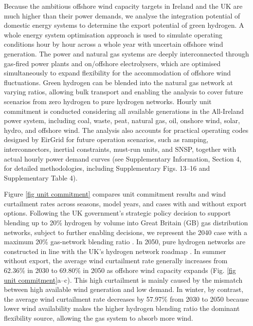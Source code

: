 \documentclass[pdflatex,sn-mathphys,Numbered]{sn-jnl}%
\begin{document}
Because the ambitious offshore wind capacity targets in Ireland and the UK are much higher than their power demands, we analyse the integration potential of domestic energy systems to determine the export potential of green hydrogen. A whole energy system optimisation approach is used to simulate operating conditions hour by hour across a whole year with uncertain offshore wind generation. The power and natural gas systems are deeply interconnected through gas-fired power plants and on/offshore electrolysers, which are optimised simultaneously to expand flexibility for the accommodation of offshore wind fluctuations. Green hydrogen can be blended into the natural gas network at varying ratios, allowing bulk transport and enabling the analysis to cover future scenarios from zero hydrogen to pure hydrogen networks.
Hourly unit commitment is conducted considering all available generations in the All-Ireland power system, including coal, waste, peat, natural gas, oil, onshore wind, solar, hydro, and offshore wind. The analysis also accounts for practical operating codes designed by EirGrid \cite{OperationalPolicy} for future operation scenarios, such as ramping, interconnectors, inertial constraints, must-run units, and SNSP, together with actual hourly power demand curves (see Supplementary Information, Section 4, for detailed methodologies, including Supplementary Figs. 13--16 and Supplementary Table 4).

Figure \ref{fig unit commitment} compares unit commitment results and wind curtailment rates across seasons, model years, and cases with and without export options. Following the UK government's strategic policy decision to support blending up to 20\% hydrogen by volume into Great Britain (GB) gas distribution networks, subject to further enabling decisions, we represent the 2040 case with a maximum 20\% gas-network blending ratio \cite{HydrogenblendinginGB}. In 2050, pure hydrogen networks are constructed in line with the UK's hydrogen network roadmap \cite{BritainsHydrogenNetworkPlan}. In summer without export, the average wind curtailment rate generally increases from 62.36\% in 2030 to 69.80\% in 2050 as offshore wind capacity expands (Fig. \ref{fig unit commitment}a--c). This high curtailment is mainly caused by the mismatch between high available wind generation and low demand. In winter, by contrast, the average wind curtailment rate decreases by 57.97\% from 2030 to 2050 because lower wind availability makes the higher hydrogen blending ratio the dominant flexibility source, allowing the gas system to absorb more wind.
\end{document}

